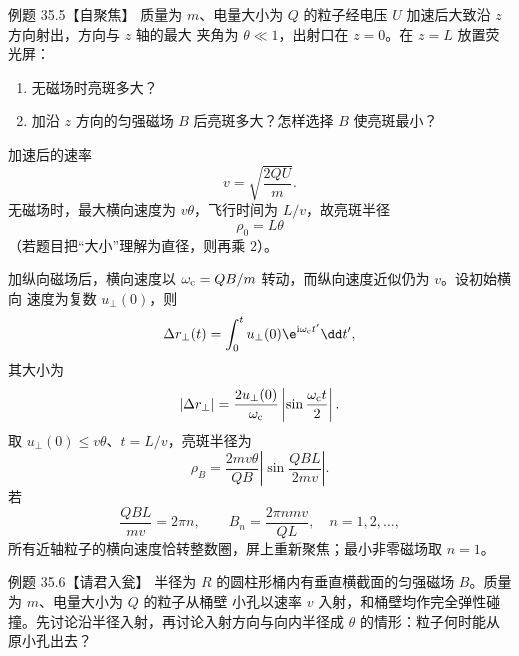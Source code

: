 \Needspace{0.44\textheight}
\begin{origexamplebox}{例题 35.5【自聚焦】}
质量为 $m$、电量大小为 $Q$ 的粒子经电压 $U$ 加速后大致沿 $z$ 方向射出，方向与 $z$ 轴的最大
夹角为 $\theta\ll1$，出射口在 $z=0$。在 $z=L$ 放置荧光屏：
\begin{enumerate}[label=(\arabic*),leftmargin=2.2em]
  \item 无磁场时亮斑多大？
  \item 加沿 $z$ 方向的匀强磁场 $B$ 后亮斑多大？怎样选择 $B$ 使亮斑最小？
\end{enumerate}
\end{origexamplebox}

\begin{xesolution}
加速后的速率
\[
  v=\sqrt{\frac{2QU}{m}}.
\]
无磁场时，最大横向速度为 $v\theta$，飞行时间为 $L/v$，故亮斑半径
\begin{equation}
  \boxed{\rho_0=L\theta}
\end{equation}
（若题目把“大小”理解为直径，则再乘 $2$）。

加纵向磁场后，横向速度以 $\omega_{\rm c}=QB/m$ 转动，而纵向速度近似仍为 $v$。设初始横向
速度为复数 $u_\perp(0)$，则
\[
  \Delta r_\perp(t)=\int_0^t u_\perp(0)\e^{\mathrm i\omega_{\rm c}t'}\dd t',
\]
其大小为
\[
  |\Delta r_\perp|=\frac{2u_\perp(0)}{\omega_{\rm c}}
  \left|\sin\frac{\omega_{\rm c}t}{2}\right|.
\]
取 $u_\perp(0)\le v\theta$、$t=L/v$，亮斑半径为
\begin{equation}
  \boxed{\rho_B=\frac{2mv\theta}{QB}
  \left|\sin\frac{QBL}{2mv}\right|}.
\end{equation}
若
\begin{equation}
  \frac{QBL}{mv}=2\pi n,
  \qquad
  \boxed{B_n=\frac{2\pi n m v}{QL}},\quad n=1,2,\ldots,
\end{equation}
所有近轴粒子的横向速度恰转整数圈，屏上重新聚焦；最小非零磁场取 $n=1$。

\beamFocusDiagram
\end{xesolution}

\Needspace{0.44\textheight}
\begin{origexamplebox}{例题 35.6【请君入瓮】}
半径为 $R$ 的圆柱形桶内有垂直横截面的匀强磁场 $B$。质量为 $m$、电量大小为 $Q$ 的粒子从桶壁
小孔以速率 $v$ 入射，和桶壁均作完全弹性碰撞。先讨论沿半径入射，再讨论入射方向与向内半径成
$\theta$ 的情形：粒子何时能从原小孔出去？
\end{origexamplebox}

